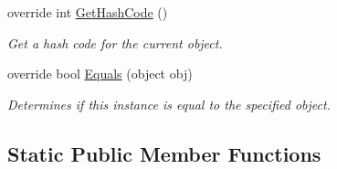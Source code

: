 \begin{DoxyCompactItemize}
override int \hyperlink{class_i_c_sharp_code_1_1_sharp_zip_lib_1_1_tar_1_1_tar_header_a0f002924ef9ba048d67af42794c2a6e5}{Get\+Hash\+Code} ()
\begin{DoxyCompactList}\small\item\em Get a hash code for the current object. \end{DoxyCompactList}\item 
override bool \hyperlink{class_i_c_sharp_code_1_1_sharp_zip_lib_1_1_tar_1_1_tar_header_a2af94c35cc70cfcae44393af42fdd318}{Equals} (object obj)
\begin{DoxyCompactList}\small\item\em Determines if this instance is equal to the specified object. \end{DoxyCompactList}\end{DoxyCompactItemize}
\subsection*{Static Public Member Functions}
